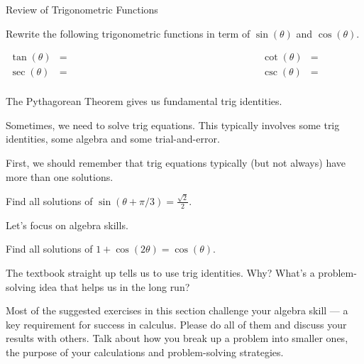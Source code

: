 \documentclass[../main.tex]{subfiles}
\begin{document}
\begin{lesson}{Review of Trigonometric Functions}
  \begin{example}
    Rewrite the following trigonometric functions in term of \(\sin(\theta)\) and \(\cos(\theta)\).

    \begin{align*}
      \tan(\theta) &= \hspace{3in} && \cot(\theta) &= \hspace{3in} \\[8ex]
      \sec(\theta) &= \hspace{3in} && \csc(\theta) &= \hspace{3in} \\[5ex]
    \end{align*}
    
  \end{example}

  The Pythagorean Theorem gives us fundamental trig identities.

  Sometimes, we need to solve trig equations. This typically involves some trig identities, some algebra and some trial-and-error. 

  First, we should remember that trig equations typically (but not always) have more than one solutions. 
  \begin{example}
    Find all solutions of \(\sin(\theta + \pi/3) = \frac{\sqrt{2}}{2}\).

  \end{example}
  \clearpage

  Let's focus on algebra skills.
  \begin{example}
    Find all solutions of \(1 + \cos(2 \theta) = \cos(\theta)\).

    {\scriptsize The textbook straight up tells us to use trig identities. Why? What's a  problem-solving idea that helps us in the long run?}

  \end{example}

  \faExclamationTriangle{} Most of the suggested exercises in this section challenge your algebra skill --- a key requirement for success in calculus. Please do all of them and discuss your results with others. Talk about how you break up a problem into smaller ones, the purpose of your calculations and problem-solving strategies. 
  \clearpage



\end{lesson}
\end{document}
